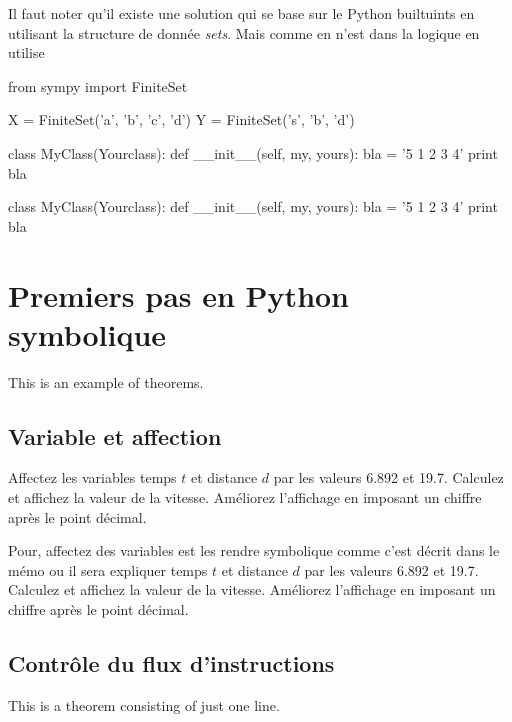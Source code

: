 \documentclass[11pt,fleqn]{book} %
\begin{document}
\begin{solution}
Il faut noter qu'il existe une solution qui se base sur le Python builtuints en utilisant la structure de donnée \textit{sets}. Mais comme en n'est dans la logique en utilise 
\begin{python}
from sympy import FiniteSet

X = FiniteSet('a', 'b', 'c', 'd')
Y = FiniteSet('s', 'b', 'd')

class MyClass(Yourclass):
    def __init__(self, my, yours):
        bla = '5 1 2 3 4'
        print bla
\end{python}
\begin{python}
class MyClass(Yourclass):
    def __init__(self, my, yours):
        bla = '5 1 2 3 4'
        print bla
\end{python}

\end{solution}
\section{Premiers pas en Python symbolique}

This is an example of theorems.

\subsection{Variable et affection}

\begin{exercise}
Affectez les variables temps $t$ et distance $d$ par les valeurs 6.892 et 19.7. Calculez et affichez la valeur de la vitesse. Améliorez l’affichage en imposant un chiffre après le point décimal.
\end{exercise}

\begin{solution}
Pour, affectez des variables est les rendre symbolique comme c'est décrit dans le mémo ou il 
sera expliquer temps $t$ et distance $d$ par les valeurs 6.892 et 19.7. Calculez et affichez la 
valeur de la vitesse. Améliorez l’affichage en imposant un chiffre après le point décimal.
\end{solution}

\subsection{Contrôle du flux d’instructions}
This is a theorem consisting of just one line.
\end{document}

